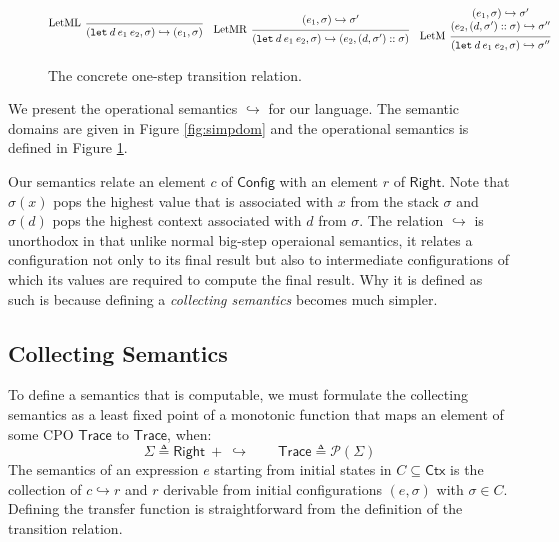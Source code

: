 \documentclass[acmsmall,screen,review]{acmart}\settopmatter{printfolios=true,printccs=false,printacmref=false}
\theoremstyle{acmdefinition}
\newcommand*{\cons}{::}
\newcommand*{\pset}{\mathcal{P}}
\newcommand*{\modid}{d}
\newcommand*{\ctx}{\sigma}
\newcommand*{\Ctx}{\mathsf{Ctx}}
\newcommand*{\Trace}{\mathsf{Trace}}
\newcommand*{\Config}{\mathsf{Config}}
\newcommand*{\config}{c}
\newcommand*{\Right}{\mathsf{Right}}
\newcommand*{\rightst}{r}
\newcommand*{\semarrow}{\hookrightarrow}
\begin{document}
\begin{figure}[t!]
  \[
    \begin{prooftree}
      \infer[left label=LetML]0{
      (\mathtt{let}\:\modid\:e_{1}\:e_{2}, \ctx)
      \semarrow
      (e_{1}, \ctx)
      }
    \end{prooftree}\quad
    \begin{prooftree}
      \hypo{
        \begin{matrix}
          (e_{1}, \ctx)
          \semarrow
          \ctx'
        \end{matrix}
      }
      \infer[left label=LetMR]1{
      (\mathtt{let}\:\modid\:e_{1}\:e_{2}, \ctx)
      \semarrow
      (e_{2}, (\modid, \ctx')\cons \ctx)
      }
    \end{prooftree}\quad
    \begin{prooftree}
      \hypo{
        \begin{matrix}
          (e_{1}, \ctx)
          \semarrow
          \ctx' \\
          (e_{2}, (\modid, \ctx')\cons \ctx)
          \semarrow
          \ctx''
        \end{matrix}
      }
      \infer[left label=LetM]1{
      (\mathtt{let}\:\modid\:e_{1}\:e_{2}, \ctx)
      \semarrow
      \ctx''
      }
    \end{prooftree}
  \]
  \caption{The concrete one-step transition relation.}
  \label{fig:simpreach}
\end{figure}
We present the operational semantics $\semarrow$ for our language.
The semantic domains are given in Figure \ref{fig:simpdom} and the operational semantics is defined in Figure \ref{fig:simpreach}.

Our semantics relate an element $\config$ of $\Config$ with an element $\rightst$ of $\Right$.
Note that $\ctx(x)$ pops the highest value that is associated with $x$ from the stack $\ctx$ and $\ctx(\modid)$ pops the highest context associated with $\modid$ from $\ctx$.
The relation $\semarrow$ is unorthodox in that unlike normal big-step operaional semantics, it relates a configuration not only to its final result but also to intermediate configurations of which its values are required to compute the final result.
Why it is defined as such is because defining a \emph{collecting semantics} becomes much simpler.

\subsection{Collecting Semantics}
To define a semantics that is computable, we must formulate the collecting semantics as a least fixed point of a monotonic function that maps an element of some CPO $\Trace$ to $\Trace$, when:
\[\Sigma\triangleq\Right\:+\:\semarrow\qquad\Trace\triangleq\pset(\Sigma)\]
The semantics of an expression $e$ starting from initial states in $C\subseteq\Ctx$ is the collection of $\config\semarrow\rightst$ and $\rightst$ derivable from initial configurations $(e,\ctx)$ with $\ctx\in C$.
Defining the transfer function is straightforward from the definition of the transition relation.
\end{document}
